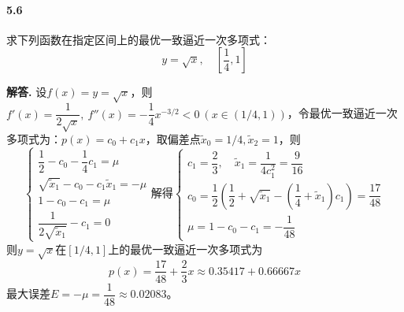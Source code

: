 \documentclass[12pt, a4paper, oneside]{ctexart}
\newenvironment{solution}{\par\noindent\textbf{解答. }}{\bigskip\par}
\begin{document}
\paragraph{5.6}求下列函数在指定区间上的最优一致逼近一次多项式：
\begin{equation*}
    y=\sqrt{x},\quad[\frac{1}{4},1]
\end{equation*}
\begin{solution}
    设$f(x) = y = \sqrt{x}$，则$f'(x) = \dfrac{1}{2\sqrt{x}},\ f''(x) = -\dfrac{1}{4}x^{-3/2}<0\ (x\in(1/4,1))$，令最优一致逼近一次多项式为：$p(x) = c_0+c_1x$，取偏差点$\tilde{x}_0 = 1/4, \tilde{x}_2=1$，则
    \begin{equation*}
        \begin{cases}
            \dfrac{1}{2} - c_0-\dfrac{1}{4}c_1=\mu\\
            \sqrt{\tilde{x}_1}-c_0-c_1\tilde{x}_1=-\mu\\
            1-c_0-c_1=\mu\\
            \dfrac{1}{2\sqrt{\tilde{x}_1}}-c_1=0
        \end{cases}
        \text{解得}
        \begin{cases}
            c_1=\dfrac{2}{3},\quad  \tilde{x}_1=\dfrac{1}{4c_1^2}=\dfrac{9}{16}\\
            c_0=\dfrac{1}{2}(\dfrac{1}{2}+\sqrt{\tilde{x}_1}-(\dfrac{1}{4}+\tilde{x}_1)c_1)=\dfrac{17}{48}\\
            \mu=1-c_0-c_1=-\dfrac{1}{48}
        \end{cases}
    \end{equation*}
    则$y=\sqrt{x}$在$[1/4,1]$上的最优一致逼近一次多项式为
    \begin{equation*}
        p(x) = \frac{17}{48}+\frac{2}{3}x\approx 0.35417+0.66667x
    \end{equation*}
    最大误差$E=-\mu = \dfrac{1}{48}\approx 0.02083$。
\end{solution}
\end{document}
